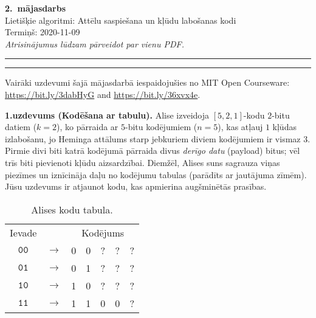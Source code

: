 \documentclass[a4paper,12pt]{article}
\begin{document}
\begin{center}
{\bf\Huge 2.\ mājasdarbs} \\[5pt]
Lietišķie algoritmi: Attēlu saspiešana un kļūdu labošanas kodi \\
Termiņš: 2020-11-09\\[5pt]
{\em Atrisinājumus lūdzam pārveidot par vienu PDF.}
\end{center}

\hrule
\vspace{2pt}
\hrule
\vspace{12pt}



{\footnotesize
Vairāki uzdevumi šajā mājasdarbā iespaidojušies no MIT Open Courseware:
\url{https://bit.ly/3dabHyG} and \url{https://bit.ly/36xvx4e}.\\
}


\vspace{10pt}
{\bf 1.uzdevums (Kodēšana ar tabulu).}
Alise izveidoja $[5,2,1]$-kodu $2$-bitu datiem ($k=2$), 
ko pārraida ar $5$-bitu kodējumiem
($n=5$), kas atļauj $1$ kļūdas izlabošanu, 
jo He\-min\-ga attālums starp jebkuriem diviem kodējumiem 
ir vismaz $3$.
Pirmie divi biti katrā kodējumā pārraida divus {\em derīgo datu} (payload)
bitus; vēl trīs biti pievienoti kļūdu aizsardzībai.
Diemžēl, Alises suns sagrauza viņas piezīmes un iznīcināja
daļu no kodējumu tabulas (parādīts ar jautājuma zī\-mēm).
Jūsu uzdevums ir atjaunot kodu, kas apmierina augš\-mi\-nē\-tās prasības.

{\footnotesize
\begin{table}[h]
\begin{center}
\begin{tabular}{ccccccc}
Ievade & & \multicolumn{5}{c}{Kodējums} \\
$\mathtt{00}$ & $\rightarrow$ & 0 & 0 & ? & ? & ? \\
$\mathtt{01}$ & $\rightarrow$ & 0 & 1 & ? & ? & ? \\
$\mathtt{10}$ & $\rightarrow$ & 1 & 0 & ? & ? & ? \\
$\mathtt{11}$ & $\rightarrow$ & 1 & 1 & 0 & 0 & ? \\
\end{tabular}
\caption{\label{tab:codes523} Alises kodu tabula.}
\end{center}
\end{table}
}
\end{document}
